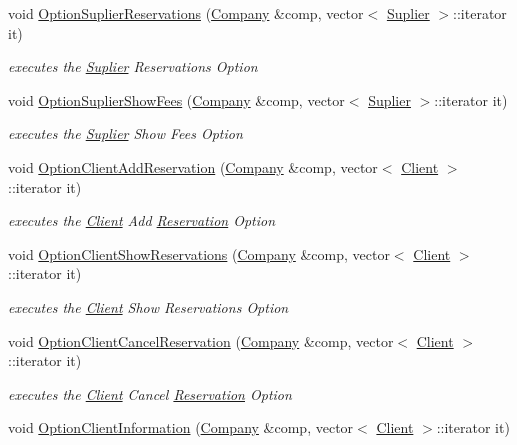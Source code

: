 \begin{DoxyCompactItemize}
void \hyperlink{class_menu_a38833a562edc41574dcac2e888a9a56f}{Option\+Suplier\+Reservations} (\hyperlink{class_company}{Company} \&comp, vector$<$ \hyperlink{class_suplier}{Suplier} $>$\+::iterator it)
\begin{DoxyCompactList}\small\item\em executes the \hyperlink{class_suplier}{Suplier} Reservations Option \end{DoxyCompactList}\item 
void \hyperlink{class_menu_aee11e9ba60e367e3f48d73033f413804}{Option\+Suplier\+Show\+Fees} (\hyperlink{class_company}{Company} \&comp, vector$<$ \hyperlink{class_suplier}{Suplier} $>$\+::iterator it)
\begin{DoxyCompactList}\small\item\em executes the \hyperlink{class_suplier}{Suplier} Show Fees Option \end{DoxyCompactList}\item 
void \hyperlink{class_menu_aec8d85a14f978bcbbd80b68dca50c8b7}{Option\+Client\+Add\+Reservation} (\hyperlink{class_company}{Company} \&comp, vector$<$ \hyperlink{class_client}{Client} $>$\+::iterator it)
\begin{DoxyCompactList}\small\item\em executes the \hyperlink{class_client}{Client} Add \hyperlink{class_reservation}{Reservation} Option \end{DoxyCompactList}\item 
void \hyperlink{class_menu_aaa94126d89c324140b5a31e6d8aeb059}{Option\+Client\+Show\+Reservations} (\hyperlink{class_company}{Company} \&comp, vector$<$ \hyperlink{class_client}{Client} $>$\+::iterator it)
\begin{DoxyCompactList}\small\item\em executes the \hyperlink{class_client}{Client} Show Reservations Option \end{DoxyCompactList}\item 
void \hyperlink{class_menu_a1b5046f15756bbb55fbad646c77019a7}{Option\+Client\+Cancel\+Reservation} (\hyperlink{class_company}{Company} \&comp, vector$<$ \hyperlink{class_client}{Client} $>$\+::iterator it)
\begin{DoxyCompactList}\small\item\em executes the \hyperlink{class_client}{Client} Cancel \hyperlink{class_reservation}{Reservation} Option \end{DoxyCompactList}\item 
void \hyperlink{class_menu_a98225b6d738861c594f16da8f5d732b3}{Option\+Client\+Information} (\hyperlink{class_company}{Company} \&comp, vector$<$ \hyperlink{class_client}{Client} $>$\+::iterator it)

\end{DoxyCompactItemize}
